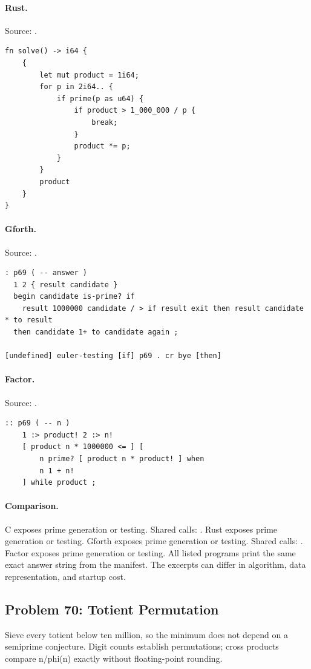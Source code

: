 \paragraph{Rust.} Source: .
\begin{lstlisting}
fn solve() -> i64 {
    {
        let mut product = 1i64;
        for p in 2i64.. {
            if prime(p as u64) {
                if product > 1_000_000 / p {
                    break;
                }
                product *= p;
            }
        }
        product
    }
}
\end{lstlisting}

\paragraph{Gforth.} Source: .
\begin{lstlisting}
: p69 ( -- answer )
  1 2 { result candidate }
  begin candidate is-prime? if
    result 1000000 candidate / > if result exit then result candidate * to result
  then candidate 1+ to candidate again ;

[undefined] euler-testing [if] p69 . cr bye [then]
\end{lstlisting}

\paragraph{Factor.} Source: .
\begin{lstlisting}
:: p69 ( -- n )
    1 :> product! 2 :> n!
    [ product n * 1000000 <= ] [
        n prime? [ product n * product! ] when
        n 1 + n!
    ] while product ;
\end{lstlisting}

\paragraph{Comparison.}
C exposes prime generation or testing. Shared calls: \texttt{}. Rust exposes prime generation or testing. Gforth exposes prime generation or testing. Shared calls: \texttt{}. Factor exposes prime generation or testing.
All listed programs print the same exact answer string from the manifest. The excerpts can differ in algorithm, data representation, and startup cost.

\subsection{Problem 70: Totient Permutation}
\label{walkthrough:p70}
Sieve every totient below ten million, so the minimum does not depend on a semiprime conjecture. Digit counts establish permutations; cross products compare n/phi(n) exactly without floating-point rounding.


